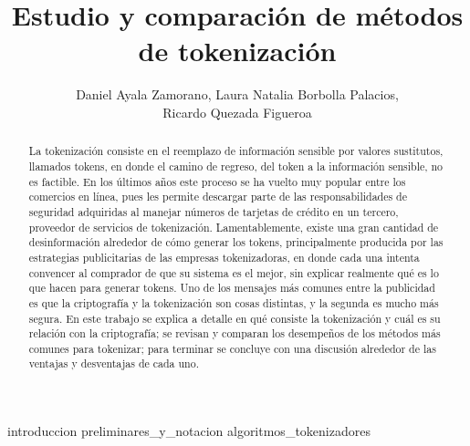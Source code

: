 \documentclass[11pt]{llncs}
\begin{document}
  \title{Estudio y comparación de métodos de tokenización}
  \author{Daniel Ayala Zamorano,
     Laura Natalia Borbolla Palacios, \\
     Ricardo Quezada Figueroa}
  \maketitle

  \begin{abstract}
    La tokenización consiste en el reemplazo de información sensible por valores
    sustitutos, llamados tokens, en donde el camino de regreso, del  token a la
    información sensible, no es factible. En los últimos años este proceso se ha
    vuelto muy popular entre los comercios en línea, pues les permite descargar
    parte de las responsabilidades de seguridad adquiridas al manejar números de
    tarjetas de crédito en un tercero, proveedor de servicios de tokenización.
    Lamentablemente, existe una gran cantidad de desinformación alrededor de
    cómo generar los tokens, principalmente producida por las estrategias
    publicitarias de las empresas tokenizadoras, en donde cada una intenta
    convencer al comprador de que su sistema es el mejor, sin explicar realmente
    qué es lo que hacen para generar tokens. Uno de los mensajes más comunes
    entre la publicidad es que la criptografía y la tokenización son cosas
    distintas, y la segunda es mucho más segura. En este trabajo se explica a
    detalle en qué consiste la tokenización y cuál es su relación con la
    criptografía; se revisan y comparan los desempeños de los métodos más comunes
    para tokenizar; para terminar se concluye con una discusión alrededor de las
    ventajas y desventajas de cada uno.
  \end{abstract}

  {introduccion}
  {preliminares_y_notacion}
  {algoritmos_tokenizadores}
\end{document}
